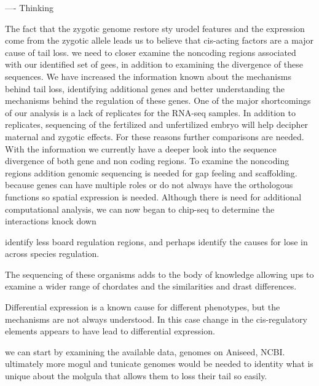 ---- Thinking


 The fact that the zygotic genome restore sty urodel features and the expression come from the zygotic allele leads us to believe that cis-acting factors are  a major cause of tail loss. we need to closer examine the noncoding regions associated with our identified set of gees, in addition to examining the divergence of these sequences. We have increased the information known about the mechanisms behind tail loss, identifying additional genes and better understanding the mechanisms behind the regulation of these genes. One of the major shortcomings of our analysis is a lack of replicates for the RNA-seq samples.   In addition to replicates, sequencing of the fertilized and unfertilized embryo will help decipher maternal and zygotic effects.
 For these reasons further comparisons are needed. With the information we currently have a deeper look into the sequence divergence of both gene and non coding regions. To examine the noncoding regions addition genomic sequencing is needed for gap feeling and scaffolding.
because genes can have multiple roles or do not always have the orthologous functions so spatial expression is needed.
Although there is need for additional computational analysis, we can now began to 
chip-seq to determine the interactions
knock down



identify less board regulation regions, and perhaps identify the causes for lose in across species regulation.

The sequencing of these organisms adds to the body of knowledge allowing ups to examine a wider range of chordates and the similarities and drast differences. 

Differential expression is a known cause for different phenotypes, but the mechanisms are not always understood. In this case change in the cis-regulatory elements appears to have lead to differential expression.

 we can start by examining the available data, genomes on Aniseed, NCBI. ultimately more mogul and tunicate genomes would be needed to identity what is unique about the molgula that allows them to loss their tail so easily.  
